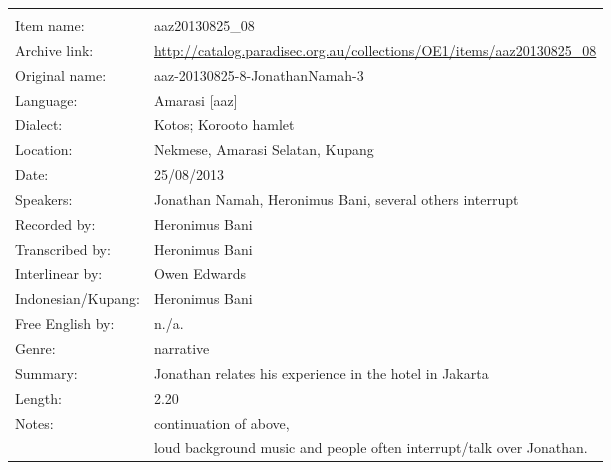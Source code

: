 \newpage
\noindent
\wg\begin{tabular}{lL{.67\textwidth}}
			& \\
Item name:			& aaz20130825{\_}08\\
Archive link:			& \url{http://catalog.paradisec.org.au/collections/OE1/items/aaz20130825_08}\\
Original name:			& aaz-20130825-8-JonathanNamah-3\\
Language:				& Amarasi [aaz] \\
Dialect:				& Kotos; Koro{\Q}oto hamlet \\
Location:				& Nekmese{\Q}, Amarasi Selatan, Kupang \\
Date:				& 25/08/2013\\
Speakers:				& Jonathan Namah, Heronimus Bani, several others interrupt \\
Recorded by:			& Heronimus Bani\\
Transcribed by:		& Heronimus Bani\\
Interlinear by:		& Owen Edwards \\
Indonesian/Kupang:		& Heronimus Bani\\
Free English by:		& n./a.\\
Genre:				& narrative\\
Summary:				& Jonathan relates his experience in the hotel in Jakarta\\
Length:				& 2.20\\
Notes:				& continuation of  above, \\
					& loud background music and people often interrupt/talk over Jonathan. \\
\end{tabular}

